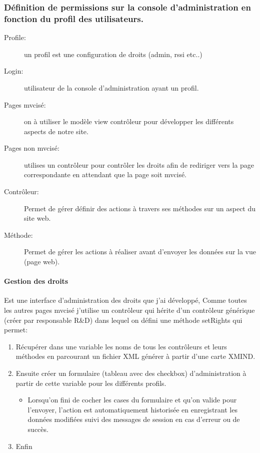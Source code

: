 \subsubsection{Définition de permissions sur la console d'administration en fonction du profil des utilisateurs.}
\begin{description}


\item[Profile:] un profil est une configuration de droits (admin, rssi etc..)

\item[Login:] utilisateur de la console d’administration ayant un profil.

\item[Pages mvcisé:] on à utiliser le modèle view contrôleur pour développer les différents aspects de notre site.

\item[Pages non mvcisé:] utilises un contrôleur pour contrôler les droits afin de rediriger vers la page correspondante en attendant que la page soit mvcisé.

\item[Contrôleur:] Permet de gérer définir des actions à travers ses méthodes sur un aspect du site web.

\item[Méthode:] Permet de gérer les actions à réaliser avant d'envoyer les données sur la vue (page web).
\end{description}

\paragraph{Gestion des droits}
Est une interface d'administration des droits que j'ai développé,
Comme toutes les autres pages mvcisé j'utilise un contrôleur qui hérite d'un contrôleur générique (créer par responsable R\&D) dans lequel on défini une méthode setRights qui permet:
\begin{enumerate}


\item Récupérer dans une variable les noms de tous les contrôleurs et leurs méthodes en parcourant un fichier XML générer à partir d'une carte XMIND.
\item Ensuite créer un formulaire (tableau avec des checkbox) d'administration à partir de cette variable pour les différents profils.
	\begin{itemize}
	\item Lorsqu'on fini de cocher les cases du formulaire et qu'on valide pour l'envoyer, l'action est automatiquement historisée en enregistrant les données modifiées suivi des messages de session en cas d'erreur ou de succès.
	\end{itemize}
\item Enfin
\end{enumerate}
